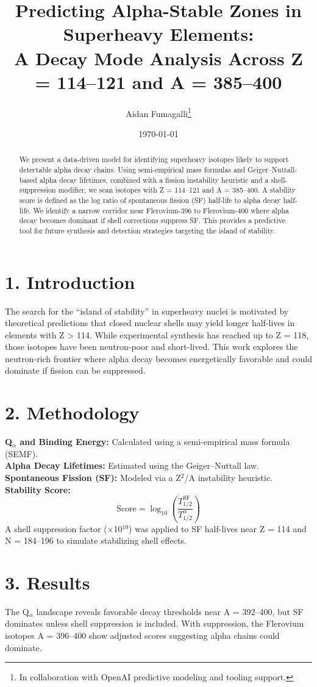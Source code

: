 \documentclass[12pt]{article}
\title{\textbf{Predicting Alpha-Stable Zones in Superheavy Elements:\\ A Decay Mode Analysis Across Z = 114–121 and A = 385–400}}
\author{Aidan Fumagalli\thanks{In collaboration with OpenAI predictive modeling and tooling support.}}
\date{\today}
\begin{document}
\maketitle

\begin{abstract}
We present a data-driven model for identifying superheavy isotopes likely to support detectable alpha decay chains. Using semi-empirical mass formulas and Geiger–Nuttall-based alpha decay lifetimes, combined with a fission instability heuristic and a shell-suppression modifier, we scan isotopes with Z = 114–121 and A = 385–400. A stability score is defined as the log ratio of spontaneous fission (SF) half-life to alpha decay half-life. We identify a narrow corridor near Flerovium-396 to Flerovium-400 where alpha decay becomes dominant if shell corrections suppress SF. This provides a predictive tool for future synthesis and detection strategies targeting the island of stability.
\end{abstract}

\section*{1. Introduction}
The search for the ``island of stability'' in superheavy nuclei is motivated by theoretical predictions that closed nuclear shells may yield longer half-lives in elements with Z > 114. While experimental synthesis has reached up to Z = 118, those isotopes have been neutron-poor and short-lived. This work explores the neutron-rich frontier where alpha decay becomes energetically favorable and could dominate if fission can be suppressed.

\section*{2. Methodology}
\textbf{Q$_\alpha$ and Binding Energy:} Calculated using a semi-empirical mass formula (SEMF).\\
\textbf{Alpha Decay Lifetimes:} Estimated using the Geiger–Nuttall law.\\
\textbf{Spontaneous Fission (SF):} Modeled via a Z$^2$/A instability heuristic.\\
\textbf{Stability Score:}
\[
\text{Score} = \log_{10} \left( \frac{T_{1/2}^{\text{SF}}}{T_{1/2}^{\alpha}} \right)
\]
A shell suppression factor (×10$^{10}$) was applied to SF half-lives near Z = 114 and N = 184–196 to simulate stabilizing shell effects.

\section*{3. Results}
The Q$_\alpha$ landscape reveals favorable decay thresholds near A = 392–400, but SF dominates unless shell suppression is included. With suppression, the Flerovium isotopes A = 396–400 show adjusted scores suggesting alpha chains could dominate.
\end{document}
